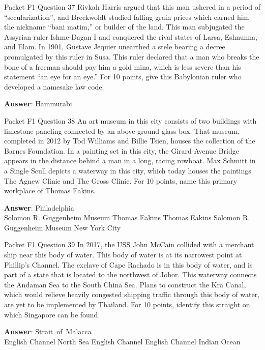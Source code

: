 \begin{frame}{Packet F1 Question 37}
Rivkah Harris argued that this man ushered in a period of ``secularization'', and Breckwoldt studied falling grain prices which earned him the nickname “bani matim,” or builder of the land. This man subjugated the Assyrian ruler Ishme-Dagan I and conquered the rival states of Larsa,   Eshnunna, and Elam.     In 1901, Gustave Jequier unearthed a stele bearing a decree promulgated by this ruler in Susa. This ruler declared that a man who breaks the bone of a freeman should pay him a gold mina, which is less severe than his statement “an eye for an eye.” For 10 points, give this Babylonian ruler who developed   a namesake law code. 

\textbf{Answer}: Hammurabi\\
\end{frame}

\begin{frame}{Packet F1 Question 38}
An art museum in this   city consists of two buildings with limestone paneling connected by an above-ground glass box. That museum, completed in 2012 by Tod Williams and Billie Tsien, houses the collection of the Barnes Foundation. In a painting set in this city, the Girard Avenue Bridge appears in the distance behind a man in a long, racing rowboat. Max Schmitt in a Single Scull depicts   a waterway in this city, which today houses the paintings The Agnew Clinic and The Gross Clinic.   For 10 points, name this primary workplace of Thomas Eakins.      

\textbf{Answer}: Philadelphia\\
 Solomon R. Guggenheim Museum
 Thomas Eakins
 Thomas Eakins
 Solomon R. Guggenheim Museum
 New York City
\end{frame}

\begin{frame}{Packet F1 Question 39}
In 2017, the USS John McCain collided with a merchant ship near this body of water. This body of water is at its narrowest point at Phillip’s Channel. The exclave of Cape Rachado is in this body of water, and is part of a state that is located to the northwest of Johor. This waterway connects the Andaman   Sea to the South China Sea. Plans to construct the Kra Canal, which would relieve heavily congested shipping traffic through this body of water, are yet to be implemented by Thailand. For 10 points, identify this straight on which Singapore can be found.        

\textbf{Answer}: Strait\ of\ Malacca\\
 English Channel
 North Sea
 English Channel
 English Channel
 Indian Ocean
\end{frame}


